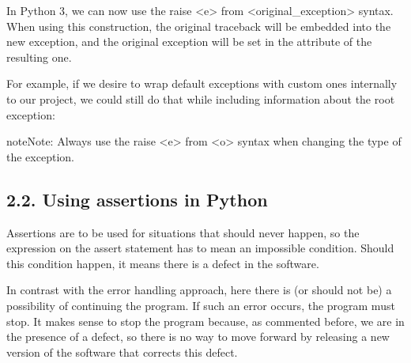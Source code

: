 \documentclass[a4paper,10pt,english]{sphinxmanual}
\begin{document}
In Python 3, we can now use the raise \textless{}e\textgreater{} from \textless{}original\_exception\textgreater{} syntax. When using this construction, the
original traceback will be embedded into the new exception, and the original exception will be set in the
 attribute of the resulting one.

For example, if we desire to wrap default exceptions with custom ones internally to our project, we could
still do that while including information about the root exception:

\begin{sphinxVerbatim}[commandchars=\\\{\}]
 
      
             \PYG{p}{[}\PYG{p}{]}
           
               
\end{sphinxVerbatim}

\begin{sphinxadmonition}{note}{Note:}
Always use the raise \textless{}e\textgreater{} from \textless{}o\textgreater{} syntax when changing the type of the exception.
\end{sphinxadmonition}


\subsection{2.2. Using assertions in Python}
\label{\detokenize{chapters/3_general_traits/index:using-assertions-in-python}}
Assertions are to be used for situations that should never happen, so the expression on the assert statement
has to mean an impossible condition. Should this condition happen, it means there is a defect in the software.

In contrast with the error handling approach, here there is (or should not be) a possibility of continuing the
program. If such an error occurs, the program must stop. It makes sense to stop the program because, as
commented before, we are in the presence of a defect, so there is no way to move forward by releasing a new
version of the software that corrects this defect.
\end{document}
